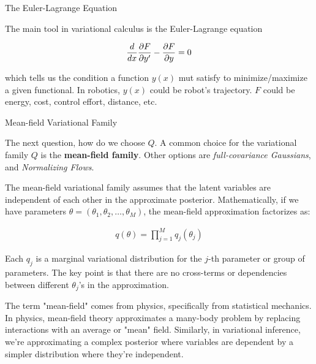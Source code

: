\documentclass[aspectratio=169,xcolor=dvipsnames,svgnames,x11names,fleqn]{beamer}
\begin{document}
\begin{frame}{The Euler-Lagrange Equation}

The main tool in variational calculus is the Euler-Lagrange equation

    \begin{tcolorbox}[vcAccent, title={\faCalculator\enspace Basic Calculus}]
    \color{vcSilver}
    \Large
\begin{align*}
\frac{d}{dx}\pdv{F}{y'} - \pdv{F}{y} = 0
\end{align*}
\end{tcolorbox}
which tells us the condition a function $y(x)$ mut satisfy to  minimize/maximize a given functional. In robotics, $y(x)$ could be robot's trajectory. $F$ could be energy, cost, control effort, distance, etc.

\end{frame}

\begin{frame}{Mean-field Variational Family}

\footnotesize

The next question, how do we choose {\color{red}$Q$}.  A common choice for the variational family $Q$ is the \textbf{mean-field family}. Other options are \textit{full-covariance Gaussians}, and \textit{Normalizing Flows}.

\begin{tcolorbox}
The mean-field variational family assumes that the latent variables are independent of each other in the approximate posterior. Mathematically, if we have parameters $\theta = (\theta_1, \theta_2, \ldots, \theta_M)$, the mean-field approximation factorizes as:


\begin{align*}
q(\theta ) = \prod_{j=1}^M q_j(\theta_j)
\end{align*}

\end{tcolorbox}

\scriptsize

 \begin{tcolorbox}[colback=white, colframe=MainBlue!10, title=~, fonttitle=\bfseries, coltitle=MainBlue]
Each $q_j$ is a marginal variational distribution for the $j$-th parameter or group of parameters. The key point is that there are no cross-terms or dependencies between different $\theta_j$'s in the approximation.
\end{tcolorbox}


\begin{tcolorbox}[blanker, borderline west={2pt}{0pt}{gray!40}, left=10pt]
\tiny
The term "mean-field" comes from physics, specifically from statistical mechanics. In physics, mean-field theory approximates a many-body problem by replacing interactions with an average or "mean" field. Similarly, in variational inference, we're approximating a complex posterior where variables are dependent by a simpler distribution where they're independent.
\end{tcolorbox}



\end{frame}
\end{document}
